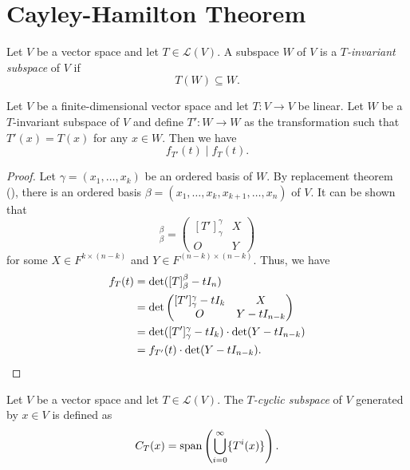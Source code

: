 \section{Cayley-Hamilton Theorem}
\begin{definition}
  Let $V$ be a vector space and let $T \in \mathcal{L}(V)$.
  A subspace $W$ of $V$ is a \emph{$T$-invariant subspace} of $V$ if
  \begin{equation*}
    T(W) \subseteq W.
  \end{equation*}
\end{definition}

\begin{theorem}
  Let $V$ be a finite-dimensional vector space and let $T: V \to V$ be linear.
  Let $W$ be a $T$-invariant subspace of $V$ and define $T': W \to W$ as the
  transformation such that $T'(x) = T(x)$ for any $x \in W$.
  Then we have
  \begin{equation*}
    f_{T'}(t) \mid f_T(t).
  \end{equation*}
\end{theorem}
\begin{proof}
  Let $\gamma = (x_1, \dots, x_k)$ be an ordered basis of $W$.
  By replacement theorem (), there is an ordered basis
  $\beta = (x_1, \dots, x_k, x_{k+1}, \dots, x_n)$ of $V$.
  It can be shown that
  \begin{equation*}
    [T]_\beta^\beta =
    \begin{pmatrix}
      [T']_\gamma^\gamma & X \\
      O & Y
    \end{pmatrix}
  \end{equation*}
  for some $X \in F^{k \times (n-k)}$ and $Y \in F^{(n-k) \times (n-k)}$.
  Thus, we have
  \begin{align*}
    f_T(t)
    &= \det([T]_\beta^\beta - tI_n) \\
    &= \det
    \begin{pmatrix}
      [T']_\gamma^\gamma - tI_k & X \\
      O & Y - tI_{n-k}
    \end{pmatrix} \\
    &= \det([T']_\gamma^\gamma - tI_k) \cdot \det(Y - tI_{n-k}) \\
    &= f_{T'}(t) \cdot \det(Y - tI_{n-k}).
    \qedhere
  \end{align*}
\end{proof}

\begin{definition}
  Let $V$ be a vector space and let $T \in \mathcal{L}(V)$.
  The \emph{$T$-cyclic subspace} of $V$ generated by $x \in V$ is defined as
  \begin{equation*}
    C_T(x) = \operatorname{span}\left(\bigcup_{i=0}^\infty \{T^i(x)\}\right).
  \end{equation*}
\end{definition}

